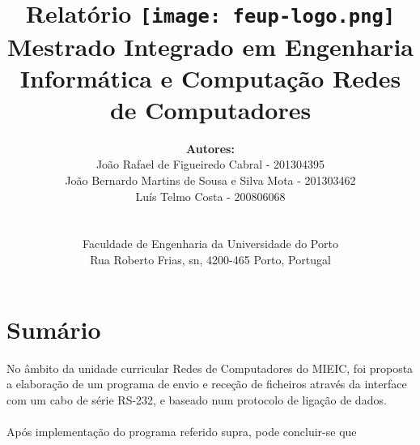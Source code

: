 \documentclass{article}
\begin{document}
\setlength{\textwidth}{16cm}
\setlength{\textheight}{22cm}

\title{
\Large\textbf{Relatório}\linebreak\linebreak
\linebreak\linebreak
\texttt{[image: feup-logo.png]}\linebreak\linebreak
\linebreak\linebreak
\Large{Mestrado Integrado em Engenharia Informática e Computação} \linebreak\linebreak
\Large{Redes de Computadores}\linebreak
}

\author{\textbf{Autores:}\\
João Rafael de Figueiredo Cabral - 201304395 \\
João Bernardo Martins de Sousa e Silva Mota - 201303462 \\
Luís Telmo Costa - 200806068\\
\linebreak\linebreak \\
 \\ Faculdade de Engenharia da Universidade do Porto \\ Rua Roberto Frias, s\/n, 4200-465 Porto, Portugal \linebreak\linebreak\linebreak
\linebreak\linebreak\vspace{1cm}}

\maketitle
\thispagestyle{empty}


\newpage

\section{Sumário}
No âmbito da unidade curricular Redes de Computadores do MIEIC, foi proposta a elaboração de um programa de envio e receção de ficheiros através da interface com um cabo de série RS-232, e baseado num protocolo de ligação de dados.\\\\
Após implementação do programa referido supra, pode concluir-se que %
\end{document}

